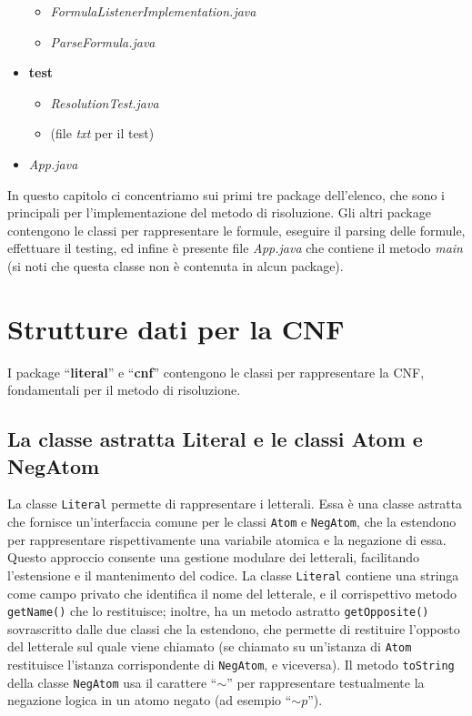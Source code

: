 \documentclass[a4paper,12pt]{report}
\begin{document}
\begin{itemize}
\begin{itemize}
            \item \textit{FormulaListenerImplementation.java}
            \item \textit{ParseFormula.java}
        \end{itemize}
    \item \textbf{test}
        \begin{itemize}
            \item \textit{ResolutionTest.java}
            \item (file \textit{txt} per il test)
        \end{itemize}
    \item \textit{App.java}
\end{itemize}
In questo capitolo ci concentriamo sui primi tre package dell'elenco, che sono i principali per l'implementazione del metodo di risoluzione. Gli altri package contengono le classi per rappresentare le formule, eseguire il parsing delle formule, effettuare il testing, ed infine è presente file \textit{App.java} che contiene il metodo \textit{main} (si noti che questa classe non è contenuta in alcun package).


\section{Strutture dati per la CNF}
I package ``\textbf{literal}'' e ``\textbf{cnf}'' contengono le classi per rappresentare la CNF, fondamentali per il metodo di risoluzione.

\subsection{La classe astratta Literal e le classi Atom e NegAtom}
La classe \texttt{Literal} permette di rappresentare i letterali. Essa è una classe astratta che fornisce un'interfaccia comune per le classi \texttt{Atom} e \texttt{NegAtom}, che la estendono per rappresentare rispettivamente una variabile atomica e la negazione di essa. Questo approccio consente una gestione modulare dei letterali, facilitando l'estensione e il mantenimento del codice. La classe \texttt{Literal} contiene una stringa come campo privato che identifica il nome del letterale, e il corrispettivo metodo \texttt{getName()} che lo restituisce; inoltre, ha un metodo astratto \texttt{getOpposite()} sovrascritto dalle due classi che la estendono, che permette di restituire l'opposto del letterale sul quale viene chiamato (se chiamato su un'istanza di \texttt{Atom} restituisce l'istanza corrispondente di \texttt{NegAtom}, e viceversa). Il metodo \texttt{toString} della classe \texttt{NegAtom} usa il carattere ``\textbf{$\sim $}'' per rappresentare testualmente la negazione logica in un atomo negato (ad esempio ``\emph{$\sim p$}'').
\end{document}
